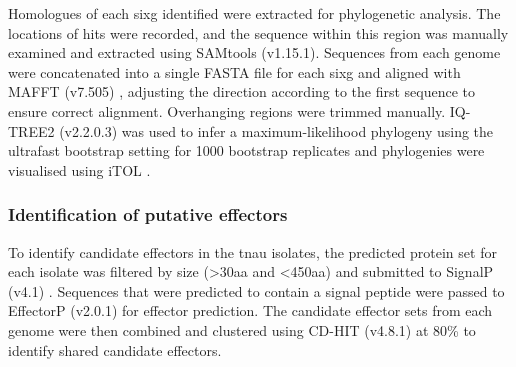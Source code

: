 Homologues of each \ac{sixg} identified were extracted for phylogenetic analysis.  The locations of hits were recorded, and the sequence within this region was manually examined and extracted using SAMtools (v1.15.1). Sequences from each genome were concatenated into a single FASTA file for each \ac{sixg} and aligned with  MAFFT (v7.505) \parencite{Katoh2019}, adjusting the direction according to the first sequence to ensure correct alignment. Overhanging regions were trimmed manually. IQ-TREE2 (v2.2.0.3) \parencite{Nguyen2015} was used to infer a maximum-likelihood phylogeny using the ultrafast bootstrap setting for 1000 bootstrap replicates and phylogenies were visualised using iTOL \parencite{Letunic2021}.

\subsubsection{Identification of putative effectors}

To identify candidate effectors in the \ac{tnau} isolates, the predicted protein set for each isolate was filtered by size (>30aa and <450aa) and submitted to SignalP (v4.1) \parencite{Petersen2011}. Sequences that were predicted to contain a signal peptide were passed to EffectorP (v2.0.1) \parencite{Sperschneider2018} for effector prediction. The candidate effector sets from each genome were then combined and clustered using CD-HIT (v4.8.1) at 80\% to identify shared candidate effectors. 



